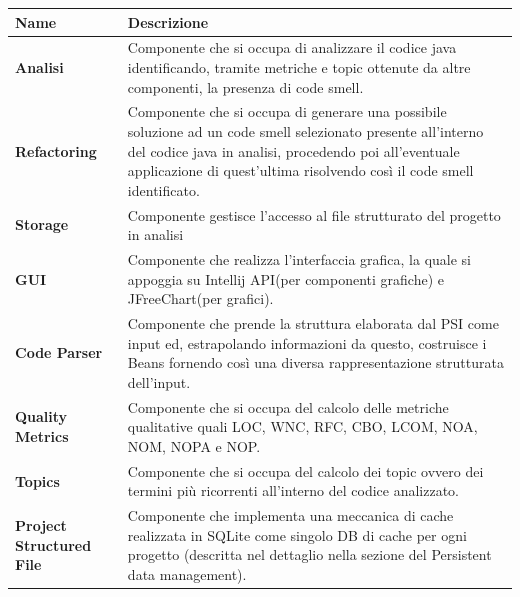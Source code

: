 \begin{tabular}{|l|p{13cm}|}
	\hline
	\textbf{\Large Name} & \textbf{\Large Descrizione} \rule[-1cm]{0mm}{2cm} \\ \hline
	
	\textbf{Analisi} &  Componente che si occupa di analizzare il codice java identificando, tramite metriche e topic ottenute da altre componenti, la presenza di code smell.
	\rule[-1cm]{0mm}{1cm} \\ \hline
	\textbf{Refactoring} & Componente che si occupa di generare una possibile soluzione ad un code smell selezionato presente all'interno del codice java in analisi, procedendo poi all'eventuale applicazione di quest'ultima risolvendo così il code smell identificato. 
	\rule[-1cm]{0mm}{1cm} \\ \hline
	\textbf{Storage} & Componente gestisce l'accesso al file strutturato del progetto in analisi
	\rule[-1cm]{0mm}{1cm} \\ \hline
	\textbf{GUI} & Componente che realizza l'interfaccia grafica, la quale si appoggia su Intellij API(per componenti grafiche) e JFreeChart(per grafici). 
	\rule[-1cm]{0mm}{1cm} \\ \hline
	\textbf{Code Parser} & Componente che prende la struttura elaborata dal PSI come input ed, estrapolando informazioni da questo, costruisce i Beans fornendo così una diversa rappresentazione strutturata dell'input.
	\rule[-1cm]{0mm}{1cm} \\ \hline
	\textbf{Quality Metrics} & Componente che si occupa del calcolo delle metriche qualitative quali LOC, WNC, RFC, CBO, LCOM, NOA, NOM, NOPA e NOP.
	\rule[-1cm]{0mm}{1cm} \\ \hline
	\textbf{Topics} & Componente che si occupa del calcolo dei topic ovvero dei termini più ricorrenti all'interno del codice analizzato.
	\rule[-1cm]{0mm}{1cm} \\ \hline	
	\textbf{Project Structured File} & Componente che implementa una meccanica di cache realizzata in SQLite come singolo DB di cache per ogni progetto (descritta nel dettaglio nella sezione del Persistent data management).
	\rule[-1cm]{0mm}{1cm} \\ \hline	
\end{tabular}

